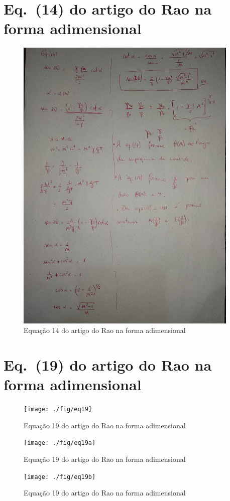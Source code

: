 \documentclass[12pt,a4paper]{article}
\begin{document}
\appendix
\section{Eq.~(14) do artigo do Rao na forma adimensional}
	\begin{figure}[!ht]
	\centering
	\includegraphics[width=0.95\textwidth]{./fig/eq14}
	\caption{Equação 14 do artigo do Rao na forma adimensional}
	\label{fig:Rao14}
\end{figure}
\newpage

\section{Eq.~(19) do artigo do Rao na forma adimensional}
\begin{figure}[!ht]
	\centering
	\texttt{[image: ./fig/eq19]}
	\caption{Equação 19 do artigo do Rao na forma adimensional}
	\label{fig:Rao19}
\end{figure}
\begin{figure}[!ht]
	\centering
	\texttt{[image: ./fig/eq19a]}
	\caption{Equação 19 do artigo do Rao na forma adimensional}
	\label{fig:Rao19a}
\end{figure}
\begin{figure}[!ht]
	\centering
	\texttt{[image: ./fig/eq19b]}
	\caption{Equação 19 do artigo do Rao na forma adimensional}
	\label{fig:Rao19b}
\end{figure}
\newpage
\end{document}
